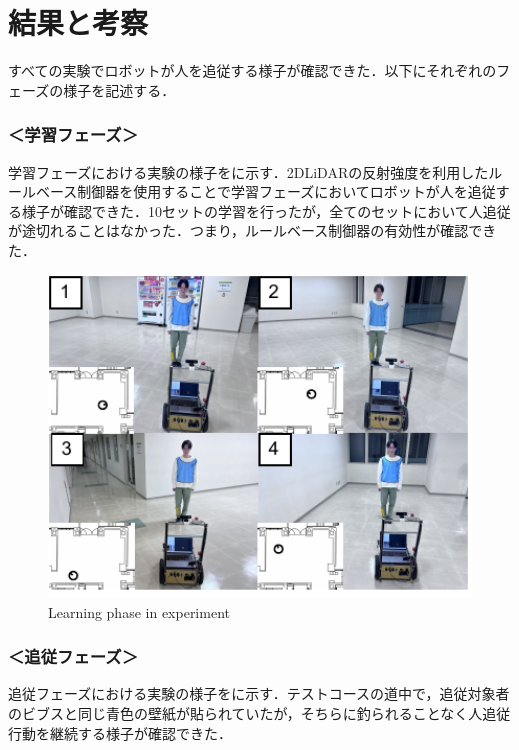 \newpage

\section{結果と考察}

  すべての実験でロボットが人を追従する様子が確認できた．以下にそれぞれのフェーズの様子を記述する．

  \subsubsection*{＜学習フェーズ＞}
  
  学習フェーズにおける実験の様子をに示す．2DLiDARの反射強度を利用したルールベース制御器を使用することで学習フェーズにおいてロボットが人を追従する様子が確認できた．10セットの学習を行ったが，全てのセットにおいて人追従が途切れることはなかった．つまり，ルールベース制御器の有効性が確認できた．

  \begin{figure}[h]
    \centering
    \includegraphics[width=12cm] {images/pdf/RobotGuidance_exp_learning_phase}
    \captionsetup{justification=raggedright} %
    \caption{Learning phase in experiment}
    \label{Fig:Learning phase in experiment}
  \end{figure}

\newpage

  \subsubsection*{＜追従フェーズ＞}
  
  追従フェーズにおける実験の様子をに示す．テストコースの道中で，追従対象者のビブスと同じ青色の壁紙が貼られていたが，そちらに釣られることなく人追従行動を継続する様子が確認できた．

